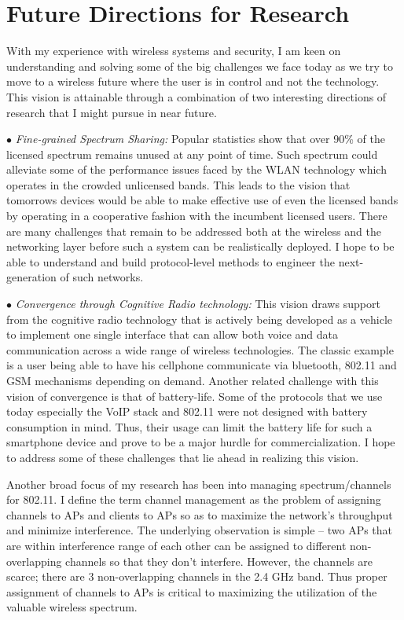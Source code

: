 \documentclass[11pt,letterpaper]{article}
\begin{document}
\section{Future Directions for Research} With my experience with wireless systems and security, I am keen on 
understanding and solving some of the big challenges we face today as we try to move to a  wireless future
where the user is in control and not the technology. This vision is attainable through a combination of two interesting 
directions of research that I might pursue in near future.

$\bullet$ {\it Fine-grained Spectrum Sharing:} Popular statistics show that over 90\% of the licensed spectrum remains
unused at any point of time.  Such spectrum could alleviate some of the performance issues faced by the WLAN technology
which operates in the crowded unlicensed bands. This leads to the vision that tomorrows devices would be able to make
effective use of even the licensed bands by operating in a cooperative fashion with the incumbent licensed users. There
are many challenges that remain to be addressed both at the wireless and the networking layer before such a system can
be realistically deployed. I hope to be able to understand and build protocol-level methods to engineer the
next-generation of such networks. 

$\bullet$ {\it Convergence through Cognitive Radio technology:} This vision draws support from the cognitive radio
technology that is actively being developed as a vehicle to implement one single interface that can allow both voice and
data communication across a wide range of wireless technologies. The classic example is a user being able to have his
cellphone communicate via bluetooth, 802.11 and GSM mechanisms depending on demand. Another related challenge with this
vision of convergence is that of battery-life. Some of the protocols that we use today especially the VoIP stack and
802.11 were not designed with battery consumption in mind. Thus, their usage can limit the battery life for such a
smartphone device and prove to be a major hurdle for commercialization. I hope to address some of these challenges that lie
ahead in realizing this vision.

\iffalse
Another broad focus of my research  has been into managing spectrum/channels for 802.11. I define the term channel management
as the problem of assigning channels to APs and clients to APs so as to maximize the network's throughput and minimize
interference. The underlying observation is simple -- two APs that are within interference range of each other can be
assigned to different non-overlapping channels so that they don't interfere. However, the channels are scarce; there are
3 non-overlapping channels in the 2.4 GHz band. Thus proper assignment of channels to APs is critical to maximizing the
utilization of the valuable wireless spectrum. 
\end{document}
